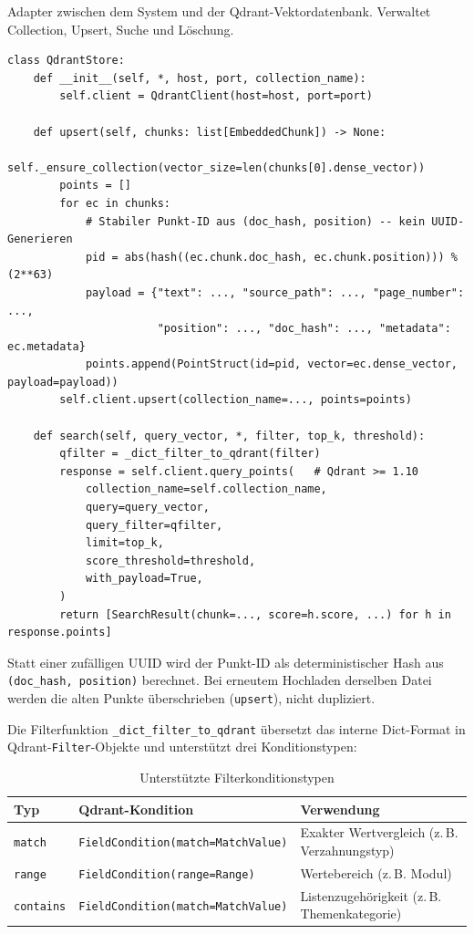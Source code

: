 \documentclass[12pt, a4paper]{article}
\begin{document}
Adapter zwischen dem System und der Qdrant-Vektordatenbank. Verwaltet Collection,
Upsert, Suche und Löschung.

\begin{lstlisting}[style=pythonstyle, caption={Vektordatenbank-Adapter (Qdrant)}]
class QdrantStore:
    def __init__(self, *, host, port, collection_name):
        self.client = QdrantClient(host=host, port=port)

    def upsert(self, chunks: list[EmbeddedChunk]) -> None:
        self._ensure_collection(vector_size=len(chunks[0].dense_vector))
        points = []
        for ec in chunks:
            # Stabiler Punkt-ID aus (doc_hash, position) -- kein UUID-Generieren
            pid = abs(hash((ec.chunk.doc_hash, ec.chunk.position))) % (2**63)
            payload = {"text": ..., "source_path": ..., "page_number": ...,
                       "position": ..., "doc_hash": ..., "metadata": ec.metadata}
            points.append(PointStruct(id=pid, vector=ec.dense_vector, payload=payload))
        self.client.upsert(collection_name=..., points=points)

    def search(self, query_vector, *, filter, top_k, threshold):
        qfilter = _dict_filter_to_qdrant(filter)
        response = self.client.query_points(   # Qdrant >= 1.10
            collection_name=self.collection_name,
            query=query_vector,
            query_filter=qfilter,
            limit=top_k,
            score_threshold=threshold,
            with_payload=True,
        )
        return [SearchResult(chunk=..., score=h.score, ...) for h in response.points]
\end{lstlisting}

\begin{infobox}
Statt einer zufälligen UUID wird der Punkt-ID als deterministischer Hash aus
\texttt{(doc\_hash, position)} berechnet. Bei erneutem Hochladen derselben Datei
werden die alten Punkte überschrieben (\texttt{upsert}), nicht dupliziert.
\end{infobox}

Die Filterfunktion \texttt{\_dict\_filter\_to\_qdrant} übersetzt das interne
Dict-Format in Qdrant-\texttt{Filter}-Objekte und unterstützt drei Konditionstypen:

\begin{table}[H]
\centering
\small
\begin{tabular}{llp{7cm}}
\toprule
\textbf{Typ} & \textbf{Qdrant-Kondition} & \textbf{Verwendung} \\
\midrule
\texttt{match} & \texttt{FieldCondition(match=MatchValue)} & Exakter Wertvergleich (z.\,B. Verzahnungstyp) \\
\texttt{range} & \texttt{FieldCondition(range=Range)} & Wertebereich (z.\,B. Modul) \\
\texttt{contains} & \texttt{FieldCondition(match=MatchValue)} & Listenzugehörigkeit (z.\,B. Themenkategorie) \\
\bottomrule
\end{tabular}
\caption{Unterstützte Filterkonditionstypen}
\end{table}
\end{document}
